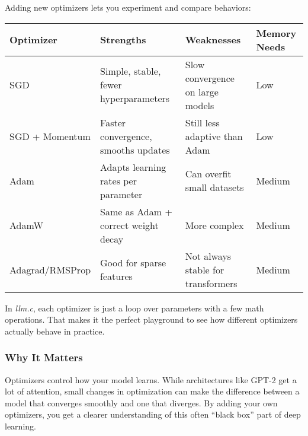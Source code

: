 \documentclass[
  letterpaper,
  DIV=11,
  numbers=noendperiod]{scrreprt}
\begin{document}
Adding new optimizers lets you experiment and compare behaviors:

\begin{longtable}[]{@{}
  >{\raggedright\arraybackslash}p{}
  >{\raggedright\arraybackslash}p{}
  >{\raggedright\arraybackslash}p{}
  >{\raggedright\arraybackslash}p{}@{}}
\toprule\noalign{}
\begin{minipage}[b]{\linewidth}\raggedright
Optimizer
\end{minipage} & \begin{minipage}[b]{\linewidth}\raggedright
Strengths
\end{minipage} & \begin{minipage}[b]{\linewidth}\raggedright
Weaknesses
\end{minipage} & \begin{minipage}[b]{\linewidth}\raggedright
Memory Needs
\end{minipage} \\
\midrule\noalign{}
\endhead
\bottomrule\noalign{}
\endlastfoot
SGD & Simple, stable, fewer hyperparameters & Slow convergence on large
models & Low \\
SGD + Momentum & Faster convergence, smooths updates & Still less
adaptive than Adam & Low \\
Adam & Adapts learning rates per parameter & Can overfit small datasets
& Medium \\
AdamW & Same as Adam + correct weight decay & More complex & Medium \\
Adagrad/RMSProp & Good for sparse features & Not always stable for
transformers & Medium \\
\end{longtable}

In \emph{llm.c}, each optimizer is just a loop over parameters with a
few math operations. That makes it the perfect playground to see how
different optimizers actually behave in practice.

\subsubsection{Why It Matters}\label{why-it-matters-57}

Optimizers control how your model learns. While architectures like GPT-2
get a lot of attention, small changes in optimization can make the
difference between a model that converges smoothly and one that
diverges. By adding your own optimizers, you get a clearer understanding
of this often ``black box'' part of deep learning.
\end{document}
